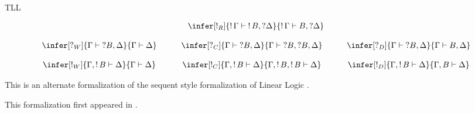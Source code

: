 \begin{entry}{TLL}
\begin{calculus}
\[\begin{array}{cccccccc}
  &&
  \infer[\bang_R]{\bang\Gamma\vdash \bang B,\quest\Delta}{\bang\Gamma\vdash B, \quest\Delta}\\
  \\
  \infer[\quest_W]{\Gamma\vdash \quest B,\Delta}{\Gamma\vdash \Delta}\quad
  &&
  \infer[\quest_C]{\Gamma\vdash \quest B,\Delta}{\Gamma\vdash \quest B,\quest B, \Delta}\quad
  &&
  \infer[\quest_D]{\Gamma\vdash \quest B,\Delta}{\Gamma\vdash B, \Delta}\\
  \\
  \infer[\bang_W]{\Gamma,\bang B\vdash \Delta}{\Gamma\vdash \Delta}\quad
  &&
  \infer[\bang_C]{\Gamma,\bang B\vdash \Delta}{\Gamma,\bang B,\bang B\vdash \Delta}\quad
  &&
  \infer[\bang_D]{\Gamma,\bang B\vdash \Delta}{\Gamma, B\vdash \Delta}
\end{array}
\]
\end{calculus}



\begin{clarifications}
This is an alternate formalization of the sequent style formalization
of Linear Logic .
\end{clarifications}

\begin{history}
This formalization first appeared in \cite{Troelstra:1992}.
\end{history}




\end{entry}
